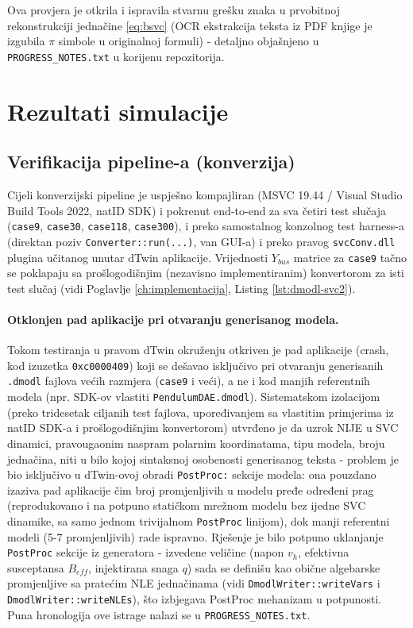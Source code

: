 \documentclass[11pt,a4paper]{report}
\begin{document}
Ova provjera je otkrila i ispravila stvarnu grešku znaka u prvobitnoj rekonstrukciji
jednačine \ref{eq:bsvc} (OCR ekstrakcija teksta iz PDF knjige je izgubila $\pi$ simbole u
originalnoj formuli) - detaljno objašnjeno u \texttt{PROGRESS\_NOTES.txt} u korijenu
repozitorija.

\section{Rezultati simulacije}

\subsection{Verifikacija pipeline-a (konverzija)}

Cijeli konverzijski pipeline je uspješno kompajliran (MSVC 19.44 / Visual Studio Build
Tools 2022, natID SDK) i pokrenut end-to-end za sva četiri test slučaja (\texttt{case9},
\texttt{case30}, \texttt{case118}, \texttt{case300}), i preko samostalnog konzolnog test
harness-a (direktan poziv \texttt{Converter::run(...)}, van GUI-a) i preko pravog
\texttt{svcConv.dll} plugina učitanog unutar dTwin aplikacije. Vrijednosti $Y_{bus}$
matrice za \texttt{case9} tačno se poklapaju sa prošlogodišnjim (nezavisno implementiranim)
konvertorom za isti test slučaj (vidi Poglavlje \ref{ch:implementacija}, Listing
\ref{lst:dmodl-svc2}).

\paragraph{Otklonjen pad aplikacije pri otvaranju generisanog modela.}
\label{sec:postproc-bug}
Tokom testiranja u
pravom dTwin okruženju otkriven je pad aplikacije (crash, kod izuzetka
\texttt{0xc0000409}) koji se dešavao isključivo pri otvaranju generisanih \texttt{.dmodl}
fajlova većih razmjera (\texttt{case9} i veći), a ne i kod manjih referentnih modela
(npr. SDK-ov vlastiti \texttt{PendulumDAE.dmodl}). Sistematskom izolacijom (preko
tridesetak ciljanih test fajlova, upoređivanjem sa vlastitim primjerima iz natID SDK-a i
prošlogodišnjim konvertorom) utvrđeno je da uzrok NIJE u SVC dinamici, pravougaonim
naspram polarnim koordinatama, tipu modela, broju jednačina, niti u bilo kojoj sintaksnoj
osobenosti generisanog teksta - problem je bio isključivo u dTwin-ovoj obradi
\texttt{PostProc:} sekcije modela: ona pouzdano izaziva pad aplikacije čim broj
promjenljivih u modelu pređe određeni prag (reprodukovano i na potpuno statičkom mrežnom
modelu bez ijedne SVC dinamike, sa samo jednom trivijalnom \texttt{PostProc} linijom), dok
manji referentni modeli (5-7 promjenljivih) rade ispravno. Rješenje je bilo potpuno
uklanjanje \texttt{PostProc} sekcije iz generatora - izvedene veličine (napon $v_h$,
efektivna susceptansa $B_{eff}$, injektirana snaga $q$) sada se definišu kao obične
algebarske promjenljive sa pratećim NLE jednačinama (vidi \texttt{DmodlWriter::writeVars}
i \texttt{DmodlWriter::writeNLEs}), što izbjegava PostProc mehanizam u potpunosti. Puna
hronologija ove istrage nalazi se u \texttt{PROGRESS\_NOTES.txt}.
\end{document}
